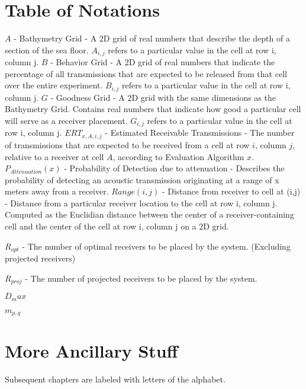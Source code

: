 
\chapter{Table of Notations}
$A$ - Bathymetry Grid - A 2D grid of real numbers that describe the depth of a section of the sea floor.  $A_{i,j}$ refers to a particular value in the cell at row i, column j.
\newline
\newline
$B$ - Behavior Grid - A 2D grid of real numbers that indicate the percentage of all transmissions that are expected to be released from that cell over the entire experiment.  $B_{i,j}$ refers to a particular value in the cell at row i, column j.
\newline
\newline
$G$ - Goodness Grid - A 2D grid with the same dimensions as the Bathymetry Grid.  Contains real numbers that indicate how good a particular cell will serve as a receiver placement.  $G_{i,j}$ refers to a particular value in the cell at row i, column j.
\newline
\newline
$ERT_{x,A,i,j}$ - Estimated Receivable Transmissions - The number of transmissions that are expected to be received from a cell at row $i$, column $j$, relative to a receiver at cell $A$, according to Evaluation Algorithm $x$.
\newline
\newline
$P_{Attenuation}(x)$ - Probability of Detection due to attenuation - Describes the probability of detecting an acoustic transmission originating at a range of x meters away from a receiver.
\newline
\newline
$Range(i,j)$ - Distance from receiver to cell at (i,j) - Distance from a particular receiver location to the cell at row i, column j.  Computed as the Euclidian distance between the center of a receiver-containing cell and the center of the cell at row i, column j on a 2D grid.

$R_{opt}$ - The number of optimal receivers to be placed by the system. (Excluding projected receivers)

$R_{proj}$ - The number of projected receivers to be placed by the system.

$D_max$

$m_{p,q}$


\chapter{More Ancillary Stuff}

Subsequent chapters are labeled with letters of the alphabet.
